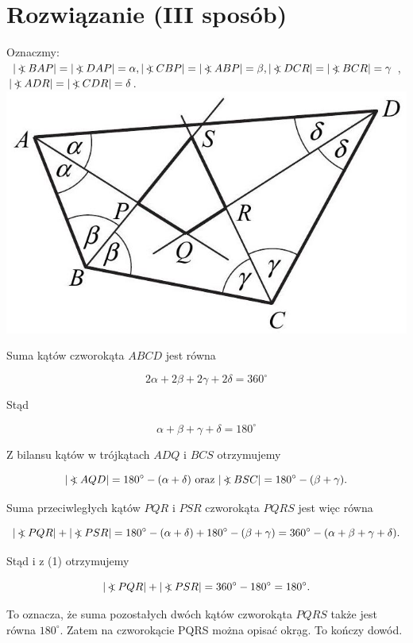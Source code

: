 \documentclass[10pt]{article}
\newcommand\Varangle{\mathop{{<\!\!\!\!\!\text{\small)}}\:}\nolimits}
\begin{document}
\section*{Rozwiązanie (III sposób)}
Oznaczmy: $|\Varangle B A P|=|\Varangle D A P|=\alpha,|\Varangle C B P|=|\Varangle A B P|=\beta,|\Varangle D C R|=|\Varangle B C R|=\gamma$, $|\Varangle A D R|=|\Varangle C D R|=\delta$.\\
\includegraphics[max width=\textwidth, center]{2025_02_07_f5f4e8f37e6baab02e47g-09}

Suma kątów czworokąta $A B C D$ jest równa

$$
2 \alpha+2 \beta+2 \gamma+2 \delta=360^{\circ}
$$

Stąd


\begin{equation*}
\alpha+\beta+\gamma+\delta=180^{\circ} \tag{1}
\end{equation*}


Z bilansu kątów w trójkątach $A D Q$ i $B C S$ otrzymujemy

$$
|\Varangle A Q D|=180^{\circ}-(\alpha+\delta) \text { oraz }|\Varangle B S C|=180^{\circ}-(\beta+\gamma) .
$$

Suma przeciwległych kątów $P Q R$ i $P S R$ czworokąta $P Q R S$ jest więc równa

$$
|\Varangle P Q R|+|\Varangle P S R|=180^{\circ}-(\alpha+\delta)+180^{\circ}-(\beta+\gamma)=360^{\circ}-(\alpha+\beta+\gamma+\delta) .
$$

Stąd i z (1) otrzymujemy

$$
|\Varangle P Q R|+|\Varangle P S R|=360^{\circ}-180^{\circ}=180^{\circ} .
$$

To oznacza, że suma pozostałych dwóch kątów czworokąta $P Q R S$ także jest równa $180^{\circ}$. Zatem na czworokącie PQRS można opisać okrạg. To kończy dowód.
\end{document}
